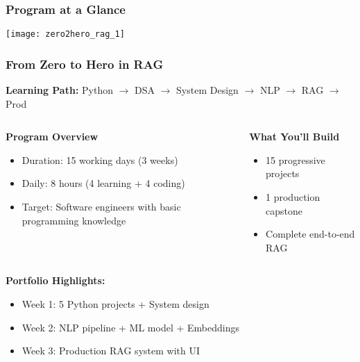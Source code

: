 \begin{frame}[fragile]\frametitle{Program at a Glance}
		\begin{center}
		\texttt{[image: zero2hero\_rag\_1]}
		\end{center}
\end{frame}

\begin{frame}[fragile]\frametitle{From Zero to Hero in RAG}

\textbf{Learning Path:} Python $\rightarrow$ DSA $\rightarrow$ System Design $\rightarrow$ NLP $\rightarrow$ RAG $\rightarrow$ Prod
\vspace{0.3cm}  


\begin{columns}
    \begin{column}[T]{0.6\linewidth}
      \textbf{Program Overview}
      \begin{itemize}
        \item Duration: 15 working days (3 weeks)
        \item Daily: 8 hours (4 learning + 4 coding)
        \item Target: Software engineers with basic programming knowledge
      \end{itemize}
    \end{column}
    \begin{column}[T]{0.4\linewidth}
      \textbf{What You'll Build}
      \begin{itemize}
        \item 15 progressive projects
        \item 1 production capstone
        \item Complete end-to-end RAG
      \end{itemize}
    \end{column}
  \end{columns}
  


\vspace{0.3cm}  
\textbf{Portfolio Highlights:}
      \begin{itemize}
        \item Week 1: 5 Python projects + System design
        \item Week 2: NLP pipeline + ML model + Embeddings
        \item Week 3: Production RAG system with UI
      \end{itemize}		
\end{frame}

